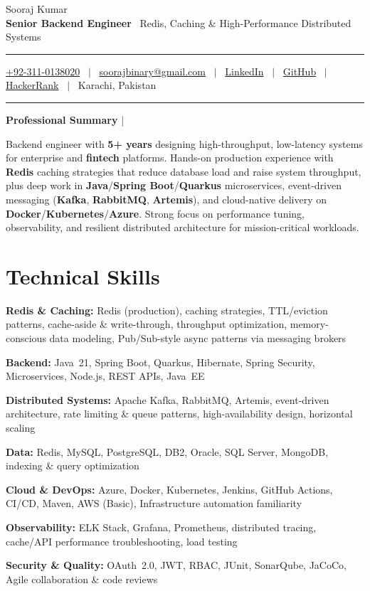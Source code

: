 \documentclass[letterpaper,10pt]{article}
\newcommand{\documentTitle}[2]{
  \begin{center}
    {\Huge\color{accentTitle} #1}
    \vspace{4pt}\\
    {\normalsize\color{accentText}\textbf{Senior Backend Engineer} \textbar\ Redis, Caching \& High-Performance Distributed Systems}
    \vspace{6pt}
    {\color{accentLine} \hrule}
    \vspace{3pt}
    \footnotesize{#2}
    \vspace{3pt}
    {\color{accentLine} \hrule}
  \end{center}
}
\newcommand{\documentFooter}[1]{
  \setlength{\footskip}{10.25pt}
  \fancyfoot[C]{\footnotesize #1}
}
\newcommand{\numberedPages}{
  \documentFooter{\thepage/\pageref{LastPage}}
}
\newcommand{\tinysection}[1]{
  \phantomsection
  \addcontentsline{toc}{section}{#1}
  {\large{\bfseries\color{accentText}#1} {\color{accentLine} |}}
}
\newenvironment{resume_list}{
  \vspace{-6pt}
  \begin{itemize}[itemsep=-1px, parsep=0.5pt, topsep=1pt, leftmargin=22pt]
}{
  \end{itemize}
  \vspace{-2pt}
}
\begin{document}
\numberedPages

\documentTitle{Sooraj Kumar}{
  \href{tel:+923110138020}{+92-311-0138020} ~$|$~
  \href{mailto:soorajbinary@gmail.com}{soorajbinary@gmail.com} ~$|$~
  \href{https://www.linkedin.com/in/soorajb2a/}{LinkedIn} ~$|$~
  \href{https://github.com/sooraj671}{GitHub} ~$|$~
  \href{https://www.hackerrank.com/profile/sooraj_bcss19}{HackerRank} ~$|$~
  Karachi, Pakistan
}

\tinysection{Professional Summary}
\vspace{3pt}
\hspace{8pt}\begin{minipage}{\dimexpr\linewidth-8pt}
Backend engineer with \textbf{5+ years} designing high-throughput, low-latency systems for enterprise and \textbf{fintech} platforms. Hands-on production experience with \textbf{Redis} caching strategies that reduce database load and raise system throughput, plus deep work in \textbf{Java}/\textbf{Spring Boot}/\textbf{Quarkus} microservices, event-driven messaging (\textbf{Kafka}, \textbf{RabbitMQ}, \textbf{Artemis}), and cloud-native delivery on \textbf{Docker}/\textbf{Kubernetes}/\textbf{Azure}. Strong focus on performance tuning, observability, and resilient distributed architecture for mission-critical workloads.
\end{minipage}
\vspace{2pt}

\section{Technical Skills}
\begin{resume_list}
  \item \textbf{Redis \& Caching:} Redis (production), caching strategies, TTL/eviction patterns, cache-aside \& write-through, throughput optimization, memory-conscious data modeling, Pub/Sub-style async patterns via messaging brokers
  \item \textbf{Backend:} Java~21, Spring Boot, Quarkus, Hibernate, Spring Security, Microservices, Node.js, REST APIs, Java~EE
  \item \textbf{Distributed Systems:} Apache Kafka, RabbitMQ, Artemis, event-driven architecture, rate limiting \& queue patterns, high-availability design, horizontal scaling
  \item \textbf{Data:} Redis, MySQL, PostgreSQL, DB2, Oracle, SQL Server, MongoDB, indexing \& query optimization
  \item \textbf{Cloud \& DevOps:} Azure, Docker, Kubernetes, Jenkins, GitHub Actions, CI/CD, Maven, AWS (Basic), Infrastructure automation familiarity
  \item \textbf{Observability:} ELK Stack, Grafana, Prometheus, distributed tracing, cache/API performance troubleshooting, load testing
  \item \textbf{Security \& Quality:} OAuth~2.0, JWT, RBAC, JUnit, SonarQube, JaCoCo, Agile collaboration \& code reviews
\end{resume_list}
\end{document}
